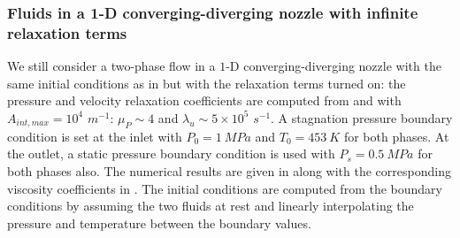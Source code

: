 \documentclass[preprint,10pt]{elsarticle}
\begin{document}
\subsubsection{Fluids in a 1-D converging-diverging nozzle with infinite relaxation terms}\label{sec:nozzle-infinite-rel-coeff}
%
We still consider a two-phase flow in a $1$-D converging-diverging nozzle with the same initial conditions as in  but with the relaxation terms turned on:  
the pressure and velocity relaxation coefficients are computed from  and  with $A_{int,max} =  
10^4$ $m^{-1}$: $\mu_P \sim 4$ and $\lambda_u \sim 5 \times 10^5$ $s^{-1}$. A stagnation pressure boundary condition is set at the inlet with $P_0 = 1 \ MPa$ and $T_0 = 453 \ K$ for both phases. At the outlet, a static pressure boundary condition is used with $P_s = 0.5 \ MPa$ for both phases also. The numerical results are given in  along with the corresponding viscosity coefficients in . The initial conditions are computed from the boundary conditions by assuming the two fluids at rest and linearly interpolating the pressure and temperature between the boundary values.
%
\end{document}
